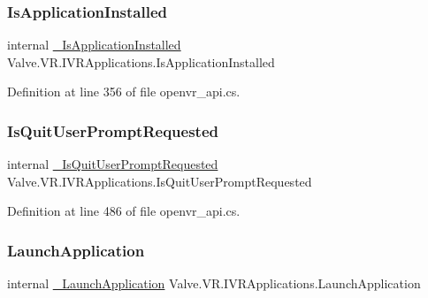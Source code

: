 \mbox{\label{struct_valve_1_1_v_r_1_1_i_v_r_applications_a41b0bcd67ef15c7da42974931df2f6ad}} 
\subsubsection{\texorpdfstring{IsApplicationInstalled}{IsApplicationInstalled}}
{\footnotesize\ttfamily internal \mbox{\hyperlink{struct_valve_1_1_v_r_1_1_i_v_r_applications_a55c08f26570b4ebbcc12d975a0580058}{\+\_\+\+Is\+Application\+Installed}} Valve.\+V\+R.\+I\+V\+R\+Applications.\+Is\+Application\+Installed}



Definition at line 356 of file openvr\+\_\+api.\+cs.

\mbox{\label{struct_valve_1_1_v_r_1_1_i_v_r_applications_ae0ffc02e21a7703c65e6c0d0483bd236}} 
\subsubsection{\texorpdfstring{IsQuitUserPromptRequested}{IsQuitUserPromptRequested}}
{\footnotesize\ttfamily internal \mbox{\hyperlink{struct_valve_1_1_v_r_1_1_i_v_r_applications_a76f4a8aeee6300e437459098141890b3}{\+\_\+\+Is\+Quit\+User\+Prompt\+Requested}} Valve.\+V\+R.\+I\+V\+R\+Applications.\+Is\+Quit\+User\+Prompt\+Requested}



Definition at line 486 of file openvr\+\_\+api.\+cs.

\mbox{\label{struct_valve_1_1_v_r_1_1_i_v_r_applications_a122f2eda209a9f552f234cd62cf583e0}} 
\subsubsection{\texorpdfstring{LaunchApplication}{LaunchApplication}}
{\footnotesize\ttfamily internal \mbox{\hyperlink{struct_valve_1_1_v_r_1_1_i_v_r_applications_acc906c27dba9c0fbc2398ae17e058352}{\+\_\+\+Launch\+Application}} Valve.\+V\+R.\+I\+V\+R\+Applications.\+Launch\+Application}



